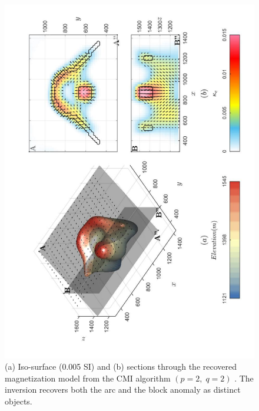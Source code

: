 \newpage
 \begin{figure}[h!]
\centering
\includegraphics[scale=0.52, angle =270]{3D_Inv_l2l2_model_AMI.pdf}
\caption{ (a) Iso-surface (0.005 SI) and (b) sections through the recovered magnetization model from the CMI algorithm $(p = 2,\; q = 2)$ . The inversion recovers both the arc and the block anomaly as distinct objects.}
\label{fig:3D_Inv_l2l2_model_AMI}
\end{figure}
